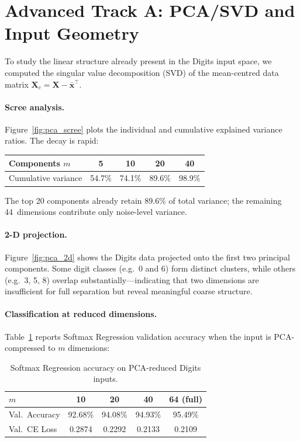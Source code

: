 \documentclass[11pt]{article}
\newcommand{\bx}{\mathbf{x}}
\newcommand{\bX}{\mathbf{X}}
\begin{document}
\section{Advanced Track A: PCA/SVD and Input Geometry}
\label{sec:pca}

To study the linear structure already present in the Digits input space, we computed the singular
value decomposition (SVD) of the mean-centred data matrix $\bX_c = \bX - \bar{\bx}^\top$.

\paragraph{Scree analysis.}
Figure~\ref{fig:pca_scree} plots the individual and cumulative explained variance ratios.  The
decay is rapid:

\begin{center}
\begin{tabular}{@{}lcccc@{}}
\toprule
Components $m$ & 5 & 10 & 20 & 40 \\
\midrule
Cumulative variance & 54.7\% & 74.1\% & 89.6\% & 98.9\% \\
\bottomrule
\end{tabular}
\end{center}

\noindent
The top 20 components already retain $89.6\%$ of total variance; the remaining
44~dimensions contribute only noise-level variance.

\paragraph{2-D projection.}
Figure~\ref{fig:pca_2d} shows the Digits data projected onto the first two principal components.
Some digit classes (e.g.\ 0 and 6) form distinct clusters, while others (e.g.\ 3, 5, 8) overlap
substantially---indicating that two dimensions are insufficient for full separation but reveal
meaningful coarse structure.

\paragraph{Classification at reduced dimensions.}
Table~\ref{tab:pca} reports Softmax Regression validation accuracy when the input is
PCA-compressed to $m$ dimensions:

\begin{table}[H]
\centering
\caption{Softmax Regression accuracy on PCA-reduced Digits inputs.}
\label{tab:pca}
\begin{tabular}{@{}lcccc@{}}
\toprule
$m$ & 10 & 20 & 40 & 64 (full) \\
\midrule
Val.\ Accuracy & 92.68\% & 94.08\% & 94.93\% & 95.49\% \\
Val.\ CE Loss  & 0.2874  & 0.2292  & 0.2133  & 0.2109  \\
\bottomrule
\end{tabular}
\end{table}
\end{document}
